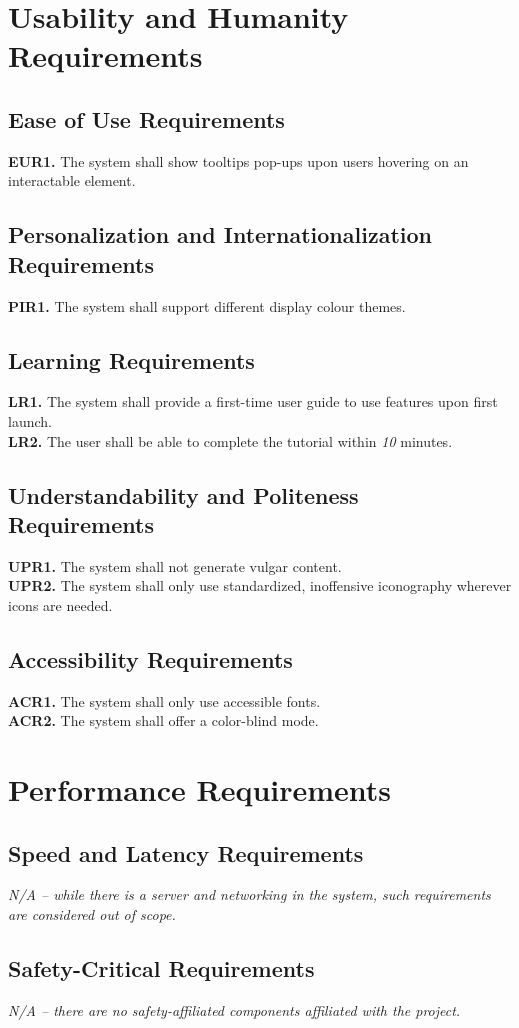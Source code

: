 \documentclass[12pt]{article}
\begin{document}
\section{Usability and Humanity Requirements}
\subsection{Ease of Use Requirements}
\textbf{EUR1.} The system shall show tooltips pop-ups upon users hovering on an interactable element.
\subsection{Personalization and Internationalization Requirements}
\textbf{PIR1.} The system shall support different display colour themes.
\subsection{Learning Requirements}
\textbf{LR1.} The system shall provide a first-time user guide to use features upon first launch. \\
\textbf{LR2.} The user shall be able to complete the tutorial within \emph{10} minutes.
\subsection{Understandability and Politeness Requirements}
\textbf{UPR1.} The system shall not generate vulgar content.\\
\textbf{UPR2.} The system shall only use standardized, inoffensive iconography wherever icons are needed.
\subsection{Accessibility Requirements}
\textbf{ACR1.} The system shall only use accessible fonts. \\
\textbf{ACR2.} The system shall offer a color-blind mode.
\section{Performance Requirements}
\subsection{Speed and Latency Requirements}
\emph{N/A -- while there is a server and networking in the system, such requirements are considered out of scope.}
\subsection{Safety-Critical Requirements}
\emph{N/A -- there are no safety-affiliated components affiliated with the project.}
\end{document}

